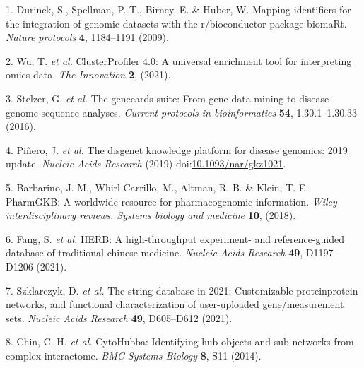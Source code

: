 \documentclass[
]{article}
\newenvironment{cslreferences}%
  {}%
  {\par}
\begin{document}
\hypertarget{refs}{}
\begin{cslreferences}
\leavevmode\hypertarget{ref-MappingIdentifDurinc2009}{}%
1. Durinck, S., Spellman, P. T., Birney, E. \& Huber, W. Mapping identifiers for the integration of genomic datasets with the r/bioconductor package biomaRt. \emph{Nature protocols} \textbf{4}, 1184--1191 (2009).

\leavevmode\hypertarget{ref-ClusterprofilerWuTi2021}{}%
2. Wu, T. \emph{et al.} ClusterProfiler 4.0: A universal enrichment tool for interpreting omics data. \emph{The Innovation} \textbf{2}, (2021).

\leavevmode\hypertarget{ref-TheGenecardsSStelze2016}{}%
3. Stelzer, G. \emph{et al.} The genecards suite: From gene data mining to disease genome sequence analyses. \emph{Current protocols in bioinformatics} \textbf{54}, 1.30.1--1.30.33 (2016).

\leavevmode\hypertarget{ref-TheDisgenetKnPinero2019}{}%
4. Piñero, J. \emph{et al.} The disgenet knowledge platform for disease genomics: 2019 update. \emph{Nucleic Acids Research} (2019) doi:\href{https://doi.org/10.1093/nar/gkz1021}{10.1093/nar/gkz1021}.

\leavevmode\hypertarget{ref-PharmgkbAWorBarbar2018}{}%
5. Barbarino, J. M., Whirl-Carrillo, M., Altman, R. B. \& Klein, T. E. PharmGKB: A worldwide resource for pharmacogenomic information. \emph{Wiley interdisciplinary reviews. Systems biology and medicine} \textbf{10}, (2018).

\leavevmode\hypertarget{ref-HerbAHighThFang2021}{}%
6. Fang, S. \emph{et al.} HERB: A high-throughput experiment- and reference-guided database of traditional chinese medicine. \emph{Nucleic Acids Research} \textbf{49}, D1197--D1206 (2021).

\leavevmode\hypertarget{ref-TheStringDataSzklar2021}{}%
7. Szklarczyk, D. \emph{et al.} The string database in 2021: Customizable proteinprotein networks, and functional characterization of user-uploaded gene/measurement sets. \emph{Nucleic Acids Research} \textbf{49}, D605--D612 (2021).

\leavevmode\hypertarget{ref-CytohubbaIdenChin2014}{}%
8. Chin, C.-H. \emph{et al.} CytoHubba: Identifying hub objects and sub-networks from complex interactome. \emph{BMC Systems Biology} \textbf{8}, S11 (2014).
\end{cslreferences}
\end{document}
